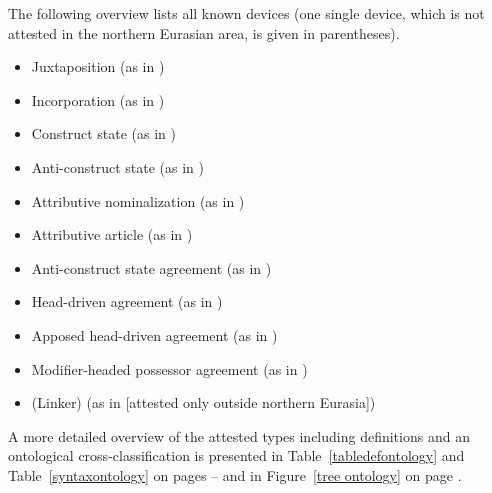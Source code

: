The following overview lists all known devices (one single device, which is not attested in the northern Eurasian area, is given in parentheses).
\begin{itemize}
\item{Juxtaposition} (as in )
\item{Incorporation} (as in )
\item{Construct state} (as in )
\item{Anti\hyp{}construct state} (as in )
\item{Attributive nominalization} (as in )
\item{Attributive article} (as in )
\item{Anti\hyp{}construct state agreement} (as in )
\item{Head\hyp{}driven agreement} (as in )
\item{Apposed head\hyp{}driven agreement} (as in )
\item{Modifier\hyp{}headed possessor agreement} (as in )
\item{(Linker)} (as in  [attested only outside northern Eurasia])
\end{itemize}
A more detailed overview of the attested types including definitions and an ontological cross-classification is presented in Table~\ref{tabledefontology} and Table~\ref{syntaxontology} on pages \pageref{tabledefontology}–\pageref{syntaxontology} and in Figure~\ref{tree ontology} on page \pageref{tree ontology}.

